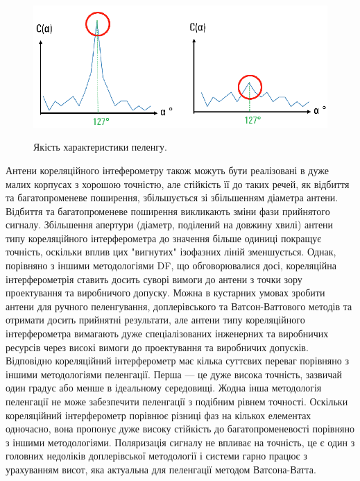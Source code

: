 \documentclass{article}
\begin{document}
\begin{figure}[H]
	\centering
	{\includegraphics[width=0.7\linewidth]{images/correletaion_interfer_graphs.png}}
	\caption{Якість характеристики пеленгу.}
\end{figure}

Антени кореляційного інтеферометру також можуть бути реалізовані в дуже малих корпусах з хорошою точністю, але стійкість її до таких речей, як відбиття та багатопроменеве поширення, збільшується зі збільшенням діаметра антени. Відбиття та багатопроменеве поширення викликають зміни фази прийнятого сигналу. Збільшення апертури (діаметр, поділений на довжину хвилі) антени типу кореляційного інтерферометра до значення більше одиниці покращує точність, оскільки вплив цих "вигнутих" ізофазних ліній зменшується. Однак, порівняно з іншими методологіями DF, що обговорювалися досі, кореляційна інтерферометрія ставить досить суворі вимоги до антени з точки зору проектування та виробничого допуску. Можна в кустарних умовах зробити антени для ручного пеленгування, доплерівського та Ватсон-Ваттового методів та отримати досить прийнятні результати, але антени типу кореляційного інтерферометра вимагають дуже спеціалізованих інженерних та виробничих ресурсів через високі вимоги до проектування та виробничих допусків. Відповідно кореляційний інтерферометр має кілька суттєвих переваг порівняно з іншими методологіями пеленгації. Перша — це дуже висока точність, зазвичай один градус або менше в ідеальному середовищі. Жодна інша методологія пеленгації не може забезпечити пеленгації з подібним рівнем точності. Оскільки кореляційний інтерферометр порівнює різниці фаз на кількох елементах одночасно, вона пропонує дуже високу стійкість до багатопроменевості порівняно з іншими методологіями. Поляризація сигналу не впливає на точність, це є один з головних недоліків доплерівської методології і системи гарно працює з урахуванням висот, яка актуальна для пеленгації методом Ватсона-Ватта. 

\end{document}
